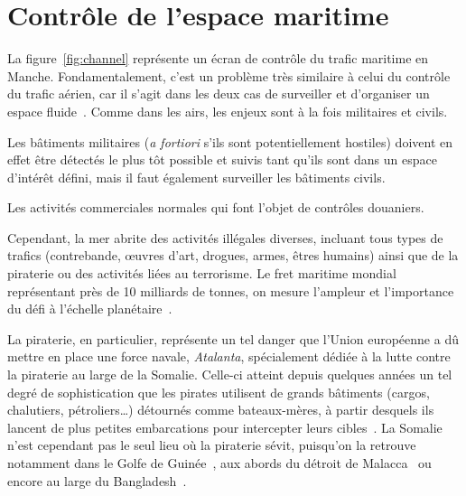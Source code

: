 \section{Contrôle de l'espace maritime}
	La figure~\ref{fig:channel} représente un écran de contrôle du trafic maritime en Manche. Fondamentalement, c'est un problème très similaire à celui du contrôle du trafic aérien, car il s'agit dans les deux cas de surveiller et d'organiser un espace fluide~\cite{henninger2012avant}. Comme dans les airs, les enjeux sont à la fois militaires et civils.
	
	Les bâtiments militaires (\emph{a fortiori} s'ils sont potentiellement hostiles) doivent en effet être détectés le plus tôt possible et suivis tant qu'ils sont dans un espace d'intérêt défini, mais il faut également surveiller les bâtiments civils.
	
	Les activités commerciales normales qui font l'objet de contrôles douaniers.
	
	Cependant, la mer abrite des activités illégales diverses, incluant tous types de trafics (contrebande, œuvres d'art, drogues, armes, êtres humains) ainsi que de la piraterie ou des activités liées au terrorisme. Le fret maritime mondial représentant près de 10 milliards de tonnes, on mesure l'ampleur et l'importance du défi à l'échelle planétaire~\cite{unctad}.
	
	La piraterie, en particulier, représente un tel danger que l'Union européenne a dû mettre en place une force navale, \emph{Atalanta}\footnotemark, spécialement dédiée à la lutte contre la piraterie au large de la Somalie. Celle-ci atteint depuis quelques années un tel degré de sophistication que les pirates utilisent de grands bâtiments (cargos, chalutiers, pétroliers\ldots{}) détournés comme bateaux-mères, à partir desquels ils lancent de plus petites embarcations pour intercepter leurs cibles~\cite{audebaud2010lutte, guisnel2012pirates, dumas2015}. La Somalie n'est cependant pas le seul lieu où la piraterie sévit, puisqu'on la retrouve notamment dans le Golfe de Guinée~\cite{onuoha2012piracy}, aux abords du détroit de Malacca~\cite{raymond2009piracy} ou encore au large du Bangladesh~\cite{liss2011oceans}.
	
	
